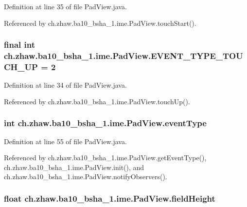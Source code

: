 Definition at line 35 of file PadView.java.

Referenced by ch.zhaw.ba10\_\-bsha\_\-1.ime.PadView.touchStart().\hypertarget{classch_1_1zhaw_1_1ba10__bsha__1_1_1ime_1_1PadView_a09fad18879227b2619c33c071a66523d}{
\subsubsection[{EVENT\_\-TYPE\_\-TOUCH\_\-UP}]{\setlength{\rightskip}{0pt plus 5cm}final int {\bf ch.zhaw.ba10\_\-bsha\_\-1.ime.PadView.EVENT\_\-TYPE\_\-TOUCH\_\-UP} = 2}}
\label{classch_1_1zhaw_1_1ba10__bsha__1_1_1ime_1_1PadView_a09fad18879227b2619c33c071a66523d}


Definition at line 34 of file PadView.java.

Referenced by ch.zhaw.ba10\_\-bsha\_\-1.ime.PadView.touchUp().\hypertarget{classch_1_1zhaw_1_1ba10__bsha__1_1_1ime_1_1PadView_a4884ead1ce1948227083986cb75b6a0a}{
\subsubsection[{eventType}]{\setlength{\rightskip}{0pt plus 5cm}int {\bf ch.zhaw.ba10\_\-bsha\_\-1.ime.PadView.eventType}}}
\label{classch_1_1zhaw_1_1ba10__bsha__1_1_1ime_1_1PadView_a4884ead1ce1948227083986cb75b6a0a}


Definition at line 55 of file PadView.java.

Referenced by ch.zhaw.ba10\_\-bsha\_\-1.ime.PadView.getEventType(), ch.zhaw.ba10\_\-bsha\_\-1.ime.PadView.init(), and ch.zhaw.ba10\_\-bsha\_\-1.ime.PadView.notifyObservers().\hypertarget{classch_1_1zhaw_1_1ba10__bsha__1_1_1ime_1_1PadView_a2d40bd61174101fd313d5964a0ae0ab2}{
\subsubsection[{fieldHeight}]{\setlength{\rightskip}{0pt plus 5cm}float {\bf ch.zhaw.ba10\_\-bsha\_\-1.ime.PadView.fieldHeight}}}
\label{classch_1_1zhaw_1_1ba10__bsha__1_1_1ime_1_1PadView_a2d40bd61174101fd313d5964a0ae0ab2}



